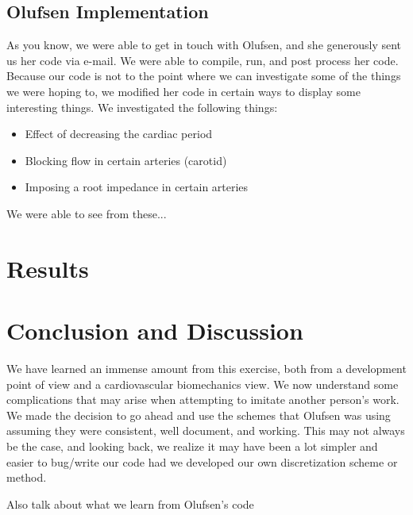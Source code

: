 \documentclass[12pt]{article}
\begin{document}
\subsection{Olufsen Implementation}
As you know, we were able to get in touch with Olufsen, and she generously sent us her code via e-mail. We were able to compile, run, and post process her code. Because our code is not to the point where we can investigate some of the things we were hoping to, we modified her code in certain ways to display some interesting things. We investigated the following things:

\begin{itemize}
	\item
		Effect of decreasing the cardiac period
	\item
		Blocking flow in certain arteries (carotid)
	\item
		Imposing a root impedance in certain arteries
\end{itemize}

We were able to see from these...

\section{Results}

\section{Conclusion and Discussion}
We have learned an immense amount from this exercise, both from a development point of view and a cardiovascular biomechanics view. We now understand some complications that may arise when attempting to imitate another person's work. We made the decision to go ahead and use the schemes that Olufsen was using assuming they were consistent, well document, and working. This may not always be the case, and looking back, we realize it may have been a lot simpler and easier to bug/write our code had we developed our own discretization scheme or method. 

Also talk about what we learn from Olufsen's code



\end{document}
